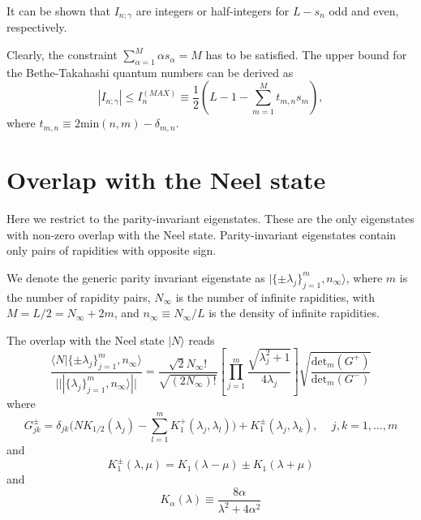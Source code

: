 \documentclass[11pt]{iopart}
\begin{document}
It can be shown that $I_{n;\gamma}$  are integers or half-integers for $L-s_n$ 
odd and even, respectively. 


Clearly, the constraint $\sum_{\alpha=1}^{M}\alpha s_\alpha=M$ 
has to be satisfied. The upper bound for the Bethe-Takahashi quantum numbers 
can be derived as   
%
\begin{equation}
|I_{n;\gamma}|\le I^{(MAX)}_{n}\equiv\frac{1}{2}(L-1-\sum
\limits_{m=1}^Mt_{m,n}s_m),
\label{bt_qn_bound}
\end{equation}
%
where $t_{m,n}\equiv 2\mbox{min}(n,m)-\delta_{m,n}$. 



\section{Overlap with the Neel state}


Here we restrict to the parity-invariant eigenstates. These are the only 
eigenstates with non-zero overlap with the Neel state. Parity-invariant 
eigenstates contain only pairs of rapidities with opposite sign.  

We denote the generic parity invariant eigenstate as $|\{\pm\lambda_j\}_{j=1}^m,
n_\infty\rangle$, where $m$ is the number of rapidity pairs, $N_{\infty}$ is the 
number of infinite rapidities, with $M=L/2=N_\infty+2m$, and $n_\infty\equiv 
N_\infty/L$ is the density of infinite rapidities. 

The overlap with the Neel state $|N\rangle$ reads 
%
\begin{equation}
\label{neel-ov}
\frac{\langle N|\{\pm\lambda_j\}_{j=1}^m,n_\infty\rangle}{|||\{\lambda_j\}_{j=1}^m,
n_\infty\rangle||}=\frac{\sqrt{2}N_{\infty}!}{\sqrt{(2N_\infty)!}}\left[\prod_{j=1}^m
\frac{\sqrt{\lambda_j^2+1}}{4\lambda_j}\right]\sqrt{\frac{\textrm{det}_m(G^+)}{
\textrm{det}_m(G^-)}}
\end{equation}
%
where 
%
\begin{equation}
\label{G-pm}
G^{\pm}_{jk}=\delta_{jk}\Big(NK_{1/2}(\lambda_j)-\sum\limits_{l=1}^mK_1^+(\lambda_j,
\lambda_l)\Big)+K_{1}^{\pm}(\lambda_j,\lambda_k),\quad\,j,k=1,\dots,m
\end{equation}
%
and 
%
\begin{equation}
\label{K-1}
K_1^\pm(\lambda,\mu)=K_1(\lambda-\mu)\pm K_1(\lambda+\mu)
\end{equation}
%
and 
%
\begin{equation}
\label{K-alpha}
K_\alpha(\lambda)\equiv\frac{8\alpha}{\lambda^2+4\alpha^2}
\end{equation}
%
\end{document}
